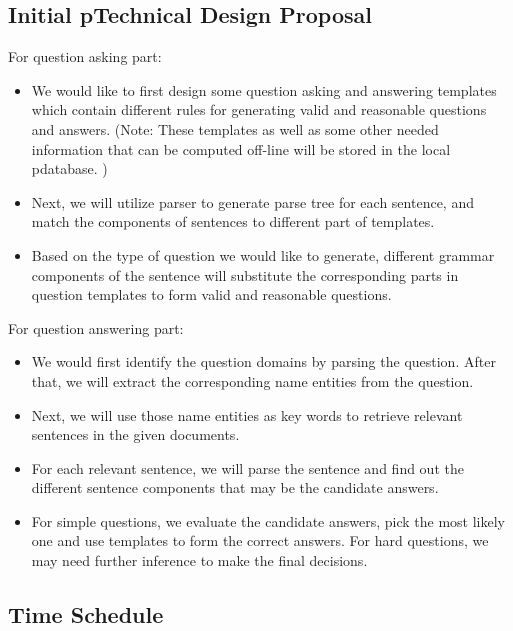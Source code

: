 \documentclass[a4page]{article}
\begin{document}
\subsection{Initial pTechnical Design Proposal}
For question asking part:
\begin{itemize}
\item We would like to first design some question asking and answering templates which contain different rules for generating valid and reasonable questions and answers. (Note: These templates as well as some other needed information that can be computed off-line will be stored in the local pdatabase. )
\item Next, we will utilize parser to generate parse tree for each sentence, and match the components of sentences to different part of templates.
\item Based on the type of question we would like to generate, different grammar components of the sentence will substitute the corresponding parts in question templates to form valid and reasonable questions.
\end{itemize}
For question answering part:
\begin{itemize}
\item We would first identify the question domains by parsing the question. After that, we will extract the corresponding name entities from the question.
\item Next, we will use those name entities as key words to retrieve relevant sentences in the given documents.
\item For each relevant sentence, we will parse the sentence and find out the different sentence components that may be the candidate answers.
\item For simple questions, we evaluate the candidate answers, pick the most likely one and use templates to form the correct answers. For hard questions, we may need further inference to make the final decisions.
\end{itemize}


\subsection{Time Schedule}
\end{document}
